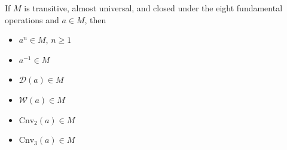 If $M$ is transitive, almost universal, and closed under the eight fundamental operations and $a \in M$, then
\begin{itemize}
\item[(1)] $a^n \in M$, $n \geq 1$
\item[(2)] $a^{-1} \in M$
\item[(3)] $\mathcal{D}(a) \in M$
\item[(4)] $\mathcal{W}(a) \in M$
\item[(5)] $\mathrm{Cnv}_2(a) \in M$
\item[(6)] $\mathrm{Cnv}_3(a) \in M$
\end{itemize}
